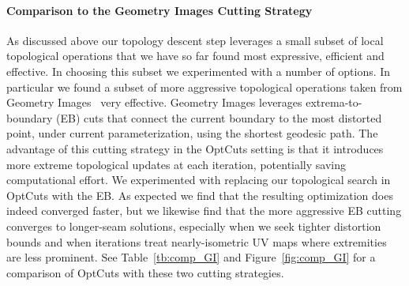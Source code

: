 \paragraph{Comparison to the Geometry Images Cutting Strategy}
As discussed above our topology descent step leverages a small subset of local topological operations that we have so far found most expressive, efficient and effective. In choosing this subset we experimented with a number of options. In particular we found a subset of more aggressive topological operations taken from Geometry Images~\cite{Gu2002Geometry} very effective. Geometry Images leverages extrema-to-boundary (EB) cuts that connect the current boundary to the most distorted point, under current parameterization, using the shortest geodesic path. The advantage of this cutting strategy in the OptCuts setting is that it introduces more extreme topological updates at each iteration, potentially saving computational effort. We experimented with replacing our topological search in OptCuts with the EB.
 As expected we find that the resulting optimization does indeed converged faster, but we likewise find that the more aggressive EB cutting converges to longer-seam solutions, especially when we seek tighter distortion bounds and when iterations treat nearly-isometric UV maps where extremities are less prominent. See Table~\ref{tb:comp_GI} and Figure~\ref{fig:comp_GI} for a comparison of OptCuts with these two cutting strategies.

